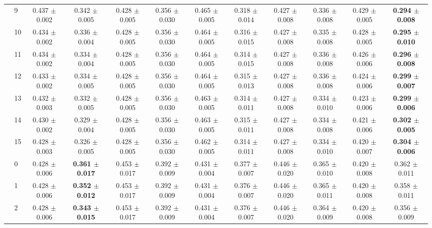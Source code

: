 \begin{table*}[t]
{\begin{tabular}{%
  ll
  @{\quad}
  c@{\hskip 4pt}c
  @{\quad\quad}
  c@{\hskip 4pt}c
  @{\quad\quad}
  c@{\hskip 4pt}c
  @{\quad\quad}
  c@{\hskip 4pt}c
  @{\quad\quad}
  c@{\hskip 4pt}c
}
        & 9 & 0.437 $\pm$ 0.002 & 0.342 $\pm$ 0.005 & 0.428 $\pm$ 0.005 & 0.356 $\pm$ 0.030 & 0.465 $\pm$ 0.005 & 0.318 $\pm$ 0.014 & 0.427 $\pm$ 0.008 & 0.336 $\pm$ 0.008 & 0.429 $\pm$ 0.005 & \textbf{0.294 $\pm$ 0.008} \\
        & 10 & 0.434 $\pm$ 0.002 & 0.336 $\pm$ 0.004 & 0.428 $\pm$ 0.005 & 0.356 $\pm$ 0.030 & 0.464 $\pm$ 0.005 & 0.316 $\pm$ 0.015 & 0.427 $\pm$ 0.008 & 0.335 $\pm$ 0.008 & 0.428 $\pm$ 0.005 & \textbf{0.295 $\pm$ 0.010} \\
        & 11 & 0.434 $\pm$ 0.002 & 0.334 $\pm$ 0.004 & 0.428 $\pm$ 0.005 & 0.356 $\pm$ 0.030 & 0.464 $\pm$ 0.005 & 0.314 $\pm$ 0.015 & 0.427 $\pm$ 0.008 & 0.336 $\pm$ 0.008 & 0.426 $\pm$ 0.006 & \textbf{0.296 $\pm$ 0.008} \\
        & 12 & 0.433 $\pm$ 0.002 & 0.334 $\pm$ 0.005 & 0.428 $\pm$ 0.005 & 0.356 $\pm$ 0.030 & 0.464 $\pm$ 0.005 & 0.315 $\pm$ 0.013 & 0.427 $\pm$ 0.008 & 0.336 $\pm$ 0.008 & 0.424 $\pm$ 0.006 & \textbf{0.299 $\pm$ 0.007} \\
        & 13 & 0.432 $\pm$ 0.003 & 0.332 $\pm$ 0.005 & 0.428 $\pm$ 0.005 & 0.356 $\pm$ 0.030 & 0.463 $\pm$ 0.005 & 0.314 $\pm$ 0.011 & 0.427 $\pm$ 0.008 & 0.334 $\pm$ 0.010 & 0.423 $\pm$ 0.006 & \textbf{0.299 $\pm$ 0.006} \\
        & 14 & 0.430 $\pm$ 0.002 & 0.329 $\pm$ 0.004 & 0.428 $\pm$ 0.005 & 0.356 $\pm$ 0.030 & 0.463 $\pm$ 0.005 & 0.315 $\pm$ 0.011 & 0.427 $\pm$ 0.008 & 0.334 $\pm$ 0.008 & 0.421 $\pm$ 0.006 & \textbf{0.302 $\pm$ 0.005} \\
        & 15 & 0.428 $\pm$ 0.003 & 0.326 $\pm$ 0.005 & 0.428 $\pm$ 0.005 & 0.356 $\pm$ 0.030 & 0.462 $\pm$ 0.005 & 0.314 $\pm$ 0.011 & 0.427 $\pm$ 0.008 & 0.334 $\pm$ 0.010 & 0.420 $\pm$ 0.007 & \textbf{0.304 $\pm$ 0.006} \\
\midrule
\assist{} & 0 & 0.428 $\pm$ 0.006 & \textbf{0.361 $\pm$ 0.017} & 0.453 $\pm$ 0.017 & 0.392 $\pm$ 0.009 & 0.431 $\pm$ 0.004 & 0.377 $\pm$ 0.007 & 0.446 $\pm$ 0.020 & 0.365 $\pm$ 0.010 & 0.420 $\pm$ 0.008 & 0.362 $\pm$ 0.011 \\
        & 1 & 0.428 $\pm$ 0.006 & \textbf{0.352 $\pm$ 0.012} & 0.453 $\pm$ 0.017 & 0.392 $\pm$ 0.009 & 0.431 $\pm$ 0.004 & 0.376 $\pm$ 0.007 & 0.446 $\pm$ 0.020 & 0.365 $\pm$ 0.011 & 0.420 $\pm$ 0.008 & 0.358 $\pm$ 0.011 \\
        & 2 & 0.428 $\pm$ 0.006 & \textbf{0.343 $\pm$ 0.015} & 0.453 $\pm$ 0.017 & 0.392 $\pm$ 0.009 & 0.431 $\pm$ 0.004 & 0.376 $\pm$ 0.007 & 0.446 $\pm$ 0.020 & 0.364 $\pm$ 0.009 & 0.420 $\pm$ 0.008 & 0.356 $\pm$ 0.009 \\

\end{tabular}}
\end{table*}
